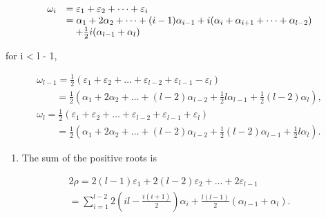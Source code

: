 \[
\begin{array}{r l} \omega_ {i} & = \varepsilon_ {1} + \varepsilon_ {2} + \dots + \varepsilon_ {i} \\ & = \alpha_ {1} + 2 \alpha_ {2} + \dots + (i - 1) \alpha_ {i - 1} + i (\alpha_ {i} + \alpha_ {i + 1} + \dots + \alpha_ {l - 2}) \\ & \quad + \frac {1}{2} i (\alpha_ {l - 1} + \alpha_ {l}) \end{array}
\]

for i \textless{} l - 1,

\[
\begin{array}{l} \omega_ {l - 1} = \frac {1}{2} (\varepsilon_ {1} + \varepsilon_ {2} + \dots + \varepsilon_ {l - 2} + \varepsilon_ {l - 1} - \varepsilon_ {l}) \\ \qquad = \frac {1}{2} (\alpha_ {1} + 2 \alpha_ {2} + \dots + (l - 2) \alpha_ {l - 2} + \frac {1}{2} l \alpha_ {l - 1} + \frac {1}{2} (l - 2) \alpha_ {l}), \\ \omega_ {l} = \frac {1}{2} (\varepsilon_ {1} + \varepsilon_ {2} + \dots + \varepsilon_ {l - 2} + \varepsilon_ {l - 1} + \varepsilon_ {l}) \\ \qquad = \frac {1}{2} (\alpha_ {1} + 2 \alpha_ {2} + \dots + (l - 2) \alpha_ {l - 2} + \frac {1}{2} (l - 2) \alpha_ {l - 1} + \frac {1}{2} l \alpha_ {l}). \end{array}
\]

\begin{enumerate}
\def\labelenumi{(\Roman{enumi})}
\setcounter{enumi}{6}
\tightlist
\item
  The sum of the positive roots is
\end{enumerate}

\[
\begin{array}{l} 2 \rho = 2 (l - 1) \varepsilon_ {1} + 2 (l - 2) \varepsilon_ {2} + \dots + 2 \varepsilon_ {l - 1} \\ = \sum_ {i = 1} ^ {l - 2} 2 (i l - \frac {i (i + 1)}{2}) \alpha_ {i} + \frac {l (l - 1)}{2} (\alpha_ {l - 1} + \alpha_ {l}). \end{array}
\]

